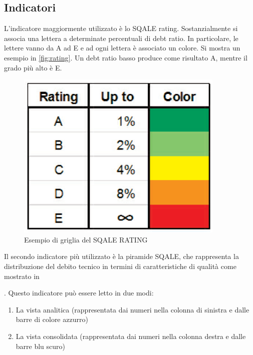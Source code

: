 \subsection{Indicatori}
L'indicatore maggiormente utilizzato è lo SQALE rating. Sostanzialmente si associa una lettera a determinate percentuali di debt ratio. In particolare, le lettere vanno da A ad E e ad ogni lettera è associato un colore. Si mostra un esempio in \autoref{fig:rating}. Un debt ratio basso produce come risultato A, mentre il grado più alto è E.
\begin{figure}[htbp]
	\centering
	\includegraphics[scale=0.5, trim = 0cm 0cm 0cm 0cm, clip=true]{figSonarCloud/SQUALE1.png}
	\caption{Esempio di griglia del SQALE RATING}
	\label{fig:rating}
\end{figure}
Il secondo indicatore più utilizzato è la piramide SQALE, che rappresenta la distribuzione del debito tecnico in termini di caratteristiche di qualità come mostrato in \author{fig:piramide}. Questo indicatore può essere letto in due modi:
\begin{enumerate}
	\item  La vista analitica (rappresentata dai numeri nella colonna di sinistra e dalle barre di colore azzurro)
	\item La vista consolidata (rappresentata dai numeri nella colonna destra e dalle barre blu scuro)
\end{enumerate}

